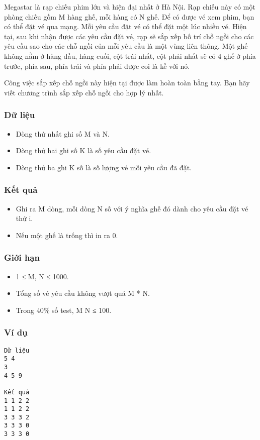 



   Megastar là rạp chiếu phim lớn và hiện đại nhất ở Hà Nội. Rạp chiếu này có một phòng chiếu gồm M hàng ghế, mỗi hàng có N ghế. Để có được vé xem phim, bạn có thể đặt vé qua mạng. Mỗi yêu cầu đặt vé có thể đặt một lúc nhiều vé. Hiện tại, sau khi nhận được các yêu cầu đặt vé, rạp sẽ sắp xếp bố trí chỗ ngồi cho các yêu cầu sao cho các chỗ ngồi của mỗi yêu cầu là một vùng liên thông. Một ghế không nằm ở hàng đầu, hàng cuối, cột trái nhất, cột phải nhất sẽ có 4 ghế ở phía trước, phía sau, phía trái và phía phải được coi là kề với nó.  

   Công việc sắp xếp chỗ ngồi này hiện tại được làm hoàn toàn bằng tay. Bạn hãy viết chương trình sắp xếp chỗ ngồi cho hợp lý nhất.  

\subsubsection{   Dữ liệu  }
\begin{itemize}
	\item     Dòng thứ nhất ghi số M và N.   
	\item     Dòng thứ hai ghi số K là số yêu cầu đặt vé.   
	\item     Dòng thứ ba ghi K số là số lượng vé mỗi yêu cầu đã đặt.   
\end{itemize}

\subsubsection{   Kết quả  }
\begin{itemize}
	\item     Ghi ra M dòng, mỗi dòng N số với ý nghĩa ghế đó dành cho yêu cầu đặt vé thứ i.   
	\item     Nếu một ghế là trống thì in ra 0.   
\end{itemize}

\subsubsection{   Giới hạn  }
\begin{itemize}
	\item     1 ≤ M, N ≤ 1000.   
	\item     Tổng số vé yêu cầu không vượt quá M * N.   
	\item     Trong 40\% số test, M N ≤ 100.   
\end{itemize}

\subsubsection{   Ví dụ  }
\begin{verbatim}
Dữ liệu
5 4
3
4 5 9

Kết quả
1 1 2 2
1 1 2 2
3 3 3 2
3 3 3 0
3 3 3 0
\end{verbatim}